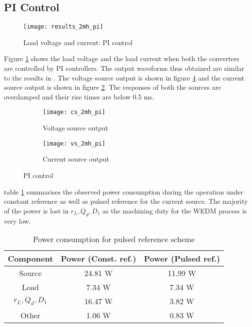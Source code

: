 \subsection{PI Control}
	\begin{figure}[H]
		\centering
		\texttt{[image: results\_2mh\_pi]}
		\caption{Load voltage and current: PI control}
		\label{fig:results_2mh_pi}
	\end{figure}
	Figure \ref{fig:results_2mh_pi} shows the load voltage and the load current when both the converters are controlled by PI controllers. The output waveforms thus obtained are similar to the results in \cite{tastekin2009novel}. The voltage source output is shown in figure \ref{fig:vs_2mh_pi} and the current source output is shown in figure \ref{fig:cs_2mh_pi}. The responses of both the sources are overdamped and their rise times are below 0.5 ms.
	\begin{figure}[H]
		\centering
		\begin{subfigure}{0.49\linewidth}
			\texttt{[image: cs\_2mh\_pi]}
			\caption{Voltage source output}
			\label{fig:cs_2mh_pi}
		\end{subfigure}
		\begin{subfigure}{0.49\linewidth}
			\texttt{[image: vs\_2mh\_pi]}
			\caption{Current source output}
			\label{fig:vs_2mh_pi}
		\end{subfigure}
		\caption{PI control}
	\end{figure}
	table \ref{tab:power} summarises the observed power consumption during the operation under constant reference as well as pulsed reference for the current source. The majority of the power is lost in $r_L, Q_d, D_1$ as the machining duty for the WEDM process is very low.
	\begin{table}[H]
		\centering
		\begin{tabular}{|c|c|c|} \hline
			\textbf{Component} & \textbf{Power (Const. ref.)} & \textbf{Power (Pulsed ref.)} \\ \hline
			Source & 24.81 W & 11.99 W \\ \hline
			Load & 7.34 W & 7.34 W \\ \hline
			$r_L, Q_d, D_1$ & 16.47 W & 3.82 W \\ \hline
			Other & 1.06 W & 0.83 W \\ \hline
		\end{tabular}
		\caption{Power consumption for pulsed reference scheme}
		\label{tab:power}
	\end{table}

